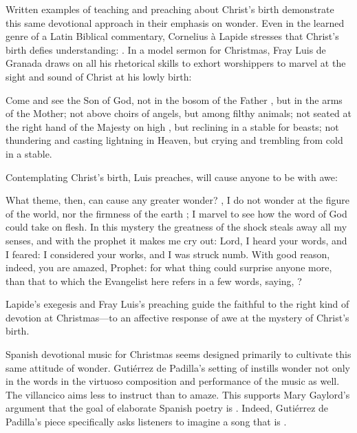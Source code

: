 Written examples of teaching and preaching about Christ's birth demonstrate this
same devotional approach in their emphasis on wonder.
Even in the learned genre of a Latin Biblical commentary, Cornelius à Lapide
stresses that Christ's birth defies understanding: 
.%
    \Autocite
    [50, on ]
    {Lapide:Gospels19C}
In a model sermon for Christmas, Fray Luis de Granada draws on all his
rhetorical skills to exhort worshippers to marvel at the sight and sound of
Christ at his lowly birth:
\begin{quoting}
    Come and see the Son of God, not in the bosom of the Father , but
    in the arms of the Mother; not above choirs of angels, but among filthy
    animals; not seated at the right hand of the Majesty on high ,
    but reclining in a stable for beasts; not thundering and casting lightning
    in Heaven, but crying and trembling from cold in a stable.%
        \Autocite[37]{LuisdeGranada:Xmas}
\end{quoting}
Contemplating Christ's birth, Luis preaches, will cause anyone to be
 with awe:
\begin{quoting}
    What theme, then, can cause any greater wonder? \Dots{} 
    , I do not wonder at the figure of the world, nor
    the firmness of the earth \Dots{}; I marvel to see how the word of God could
    take on flesh. \Dots{} 
    In this mystery the greatness of the shock steals away all my senses, and
    with the prophet  it makes me cry out: Lord, I heard your words,
    and I feared: I considered your works, and I was struck numb.
    With good reason, indeed, you are amazed, Prophet: for what thing could
    surprise anyone more, than that to which the Evangelist here refers in a few
    words, saying, ?%
        \Autocite[38]{LuisdeGranada:Xmas}
\end{quoting}
Lapide's exegesis and Fray Luis's preaching guide the faithful to the right kind
of devotion at Christmas---to an affective response of awe at the mystery of
Christ's birth.

Spanish devotional music for Christmas seems designed primarily to cultivate
this same attitude of wonder.
Gutiérrez de Padilla's setting of  instills
wonder not only in the words in the virtuoso composition and performance of the
music as well.
The villancico aims less to instruct than to amaze. 
This supports Mary Gaylord's argument that the goal of elaborate Spanish poetry
is .%
    \Autocite[227]{Gaylord:Poetry}
Indeed, Gutiérrez de Padilla's piece specifically asks listeners to imagine a
song that is .

